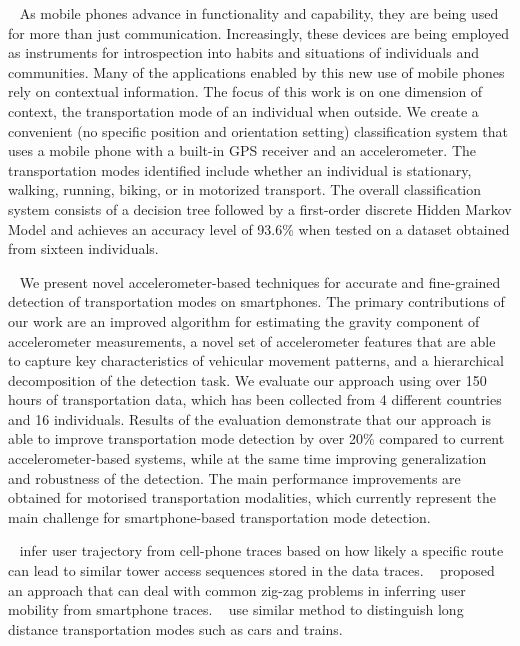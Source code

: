 ~\cite{Reddy:2010:UMP:1689239.1689243}
As mobile phones advance in functionality and capability, they are being used for more than just communication. Increasingly, these devices are being employed as instruments for introspection into habits and situations of individuals and communities. Many of the applications enabled by this new use of mobile phones rely on contextual information. The focus of this work is on one dimension of context, the transportation mode of an individual when outside. We create a convenient (no specific position and orientation setting) classification system that uses a mobile phone with a built-in GPS receiver and an accelerometer. The transportation modes identified include whether an individual is stationary, walking, running, biking, or in motorized transport. The overall classification system consists of a decision tree followed by a first-order discrete Hidden Markov Model and achieves an accuracy level of 93.6\% when tested on a dataset obtained from sixteen individuals.

~\cite{Hemminki:2013:ATM:2517351.2517367}
We present novel accelerometer-based techniques for accurate and fine-grained detection of transportation modes on smartphones. The primary contributions of our work are an improved algorithm for estimating the gravity component of accelerometer measurements, a novel set of accelerometer features that are able to capture key characteristics of vehicular movement patterns, and a hierarchical decomposition of the detection task. We evaluate our approach using over 150 hours of transportation data, which has been collected from 4 different countries and 16 individuals. Results of the evaluation demonstrate that our approach is able to improve transportation mode detection by over 20\% compared to current accelerometer-based systems, while at the same time improving generalization and robustness of the detection. The main performance improvements are obtained for motorised transportation modalities, which currently represent the main challenge for smartphone-based transportation mode detection.



~\cite{Alsolami2012Auth,jiang2013review} infer user trajectory from cell-phone traces based on how likely a specific route can lead to similar tower access sequences stored in the data traces. ~\cite{bekhor2015investigation} proposed an approach that can deal with common zig-zag problems in inferring user mobility from smartphone traces. ~\cite{doyle2011utilising} use similar method to distinguish long distance transportation modes such as cars and trains.

